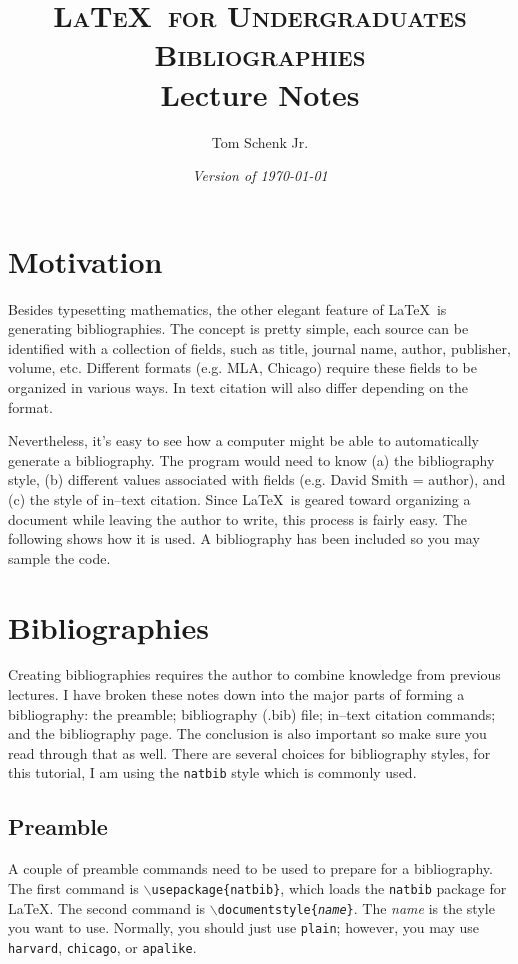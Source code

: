 \documentclass{article}
\title{\textsc{\LaTeX\ for Undergraduates\\
			Bibliographies} \\
			Lecture Notes}
\author{Tom Schenk Jr.}
\date{\textit{Version of \today}}
\begin{document}
\maketitle

\section{Motivation}

Besides typesetting mathematics, the other elegant feature of \LaTeX\ is generating bibliographies. The concept is pretty simple, each source can be identified with a collection of fields, such as title, journal name, author, publisher, volume, etc. Different formats (e.g. MLA, Chicago) require these fields to be organized in various ways. In text citation will also differ depending on the format.

Nevertheless, it's easy to see how a computer might be able to automatically generate a bibliography. The program would need to know (a) the bibliography style, (b) different values associated with fields (e.g. David Smith = author), and (c) the style of in--text citation. Since \LaTeX\ is geared toward organizing a document while leaving the author to write, this process is fairly easy. The following shows how it is used. A bibliography has been included so you may sample the code.


\section{Bibliographies}

Creating bibliographies requires the author to combine knowledge from previous lectures. I have broken these notes down into the major parts of forming a bibliography: the preamble; bibliography (.bib) file; in--text citation commands; and the bibliography page. The conclusion is also important so make sure you read through that as well. There are several choices for bibliography styles, for this tutorial, I am using the \texttt{natbib} style which is commonly used.

\subsection{Preamble}

A couple of preamble commands need to be used to prepare for a bibliography. The first command is \texttt{$\backslash$usepackage\{natbib\}}, which loads the \texttt{natbib} package for \LaTeX. The second command is \texttt{$\backslash$documentstyle\{\textit{name}\}}. The \textit{name} is the style you want to use. Normally, you should just use \texttt{plain}; however, you may use \texttt{harvard}, \texttt{chicago}, or \texttt{apalike}.
\end{document}
